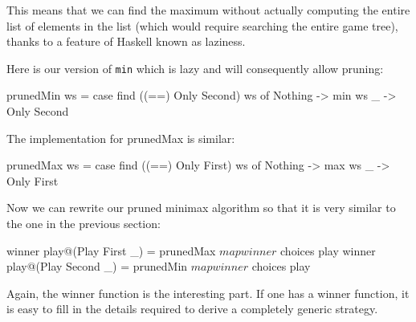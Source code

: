 This means that we can find the maximum without actually computing the entire list of elements in the list (which would require searching the entire game tree), thanks to a feature of Haskell known as laziness.

Here is our version of \texttt{min} which is lazy and will consequently allow pruning:

\begin{code}
  prunedMin ws = 
    case find ((==) Only Second) ws of
      Nothing -> min ws
      _ -> Only Second
\end{code}

The implementation for prunedMax is similar:

\begin{code}
  prunedMax ws = 
    case find ((==) Only First) ws of
      Nothing -> max ws
      _ -> Only First
\end{code}


Now we can rewrite our pruned minimax algorithm so that it is very similar to the one in the previous section:

\begin{code}
  winner play@(Play First _) = 
    prunedMax $ map winner $ choices play
  winner play@(Play Second _) = 
    prunedMin $ map winner $ choices play
\end{code}


Again, the winner function is the interesting part. If one has a winner function, it is easy to fill in the details required to derive a completely generic strategy.
